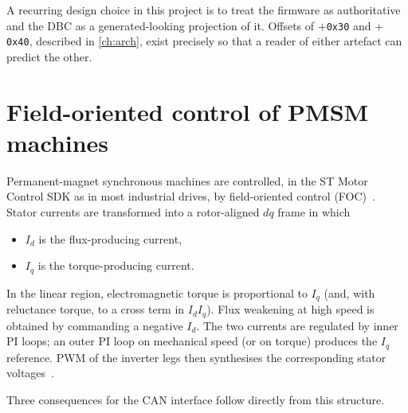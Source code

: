 A recurring design choice in this project is to treat the firmware as
authoritative and the DBC as a generated-looking projection of it. Offsets
of $+$\texttt{0x30} and $+$\texttt{0x40}, described in
\cref{ch:arch}, exist precisely so that a reader of either artefact can
predict the other.

\section{Field-oriented control of PMSM machines}
\label{sec:foc}

Permanent-magnet synchronous machines are controlled, in the ST Motor
Control SDK as in most industrial drives, by field-oriented control
(FOC)~\cite{park1929,leonhard1996foc,krishnan2010pmsm}. Stator currents
are transformed into a rotor-aligned $dq$ frame in which

\begin{itemize}[leftmargin=1.6em]
  \item $I_d$ is the flux-producing current,
  \item $I_q$ is the torque-producing current.
\end{itemize}

In the linear region, electromagnetic torque is proportional to $I_q$
(and, with reluctance torque, to a cross term in $I_d I_q$). Flux weakening
at high speed is obtained by commanding a negative $I_d$. The two currents
are regulated by inner PI loops; an outer PI loop on mechanical speed (or
on torque) produces the $I_q$ reference. PWM of the inverter legs
then synthesises the corresponding stator voltages~\cite{holmes2003pwm}.

Three consequences for the CAN interface follow directly from this
structure.

